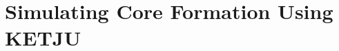 \documentclass[english, twoside]{HYgradu}
\begin{document}






\chapter{Simulating Core Formation Using KETJU} \label{chapter:4}
\end{document}
